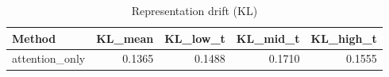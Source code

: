 \begin{table}[htbp]
\centering
\caption{Representation drift (KL)}
\label{tab:repr-drift}
\begin{tabular}{lrrrr}
\toprule
\textbf{Method} & \textbf{KL\_mean} & \textbf{KL\_low\_t} & \textbf{KL\_mid\_t} & \textbf{KL\_high\_t} \\
\midrule
attention\_only & 0.1365 & 0.1488 & 0.1710 & 0.1555 \\
\bottomrule
\end{tabular}
\end{table}